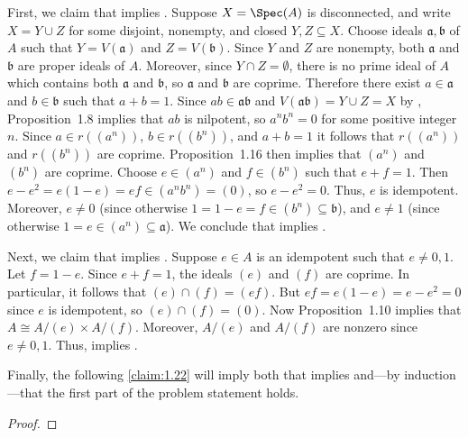 \begin{solution}
First, we claim that  implies .
Suppose \(X = \Spec(A)\) is disconnected, and write \(X = Y \cup Z\) for some disjoint, nonempty, and closed \(Y, Z \subseteq X\).
Choose ideals \(\mathfrak{a}, \mathfrak{b}\) of \(A\) such that \(Y = V(\mathfrak{a})\) and \(Z = V(\mathfrak{b})\).
Since \(Y\) and \(Z\) are nonempty, both \(\mathfrak{a}\) and \(\mathfrak{b}\) are proper ideals of \(A\).
Moreover, since \(Y \cap Z = \emptyset\), there is no prime ideal of \(A\) which contains both \(\mathfrak{a}\) and \(\mathfrak{b}\), so \(\mathfrak{a}\) and \(\mathfrak{b}\) are coprime.
Therefore there exist \(a \in \mathfrak{a}\) and \(b \in \mathfrak{b}\) such that \(a + b = 1\).
Since \(a b \in \mathfrak{a} \mathfrak{b}\) and \(V(\mathfrak{a} \mathfrak{b}) = Y \cup Z = X\) by , Proposition~1.8 implies that \(a b\) is nilpotent, so \(a^n b^n = 0\) for some positive integer \(n\).
Since \(a \in r((a^n))\), \(b \in r((b^n))\), and \(a + b = 1\) it follows that \(r((a^n))\) and \(r((b^n))\) are coprime.
Proposition~1.16 then implies that \((a^n)\) and \((b^n)\) are coprime.
Choose \(e \in (a^n)\) and \(f \in (b^n)\) such that \(e + f = 1\).
Then \(e - e^2 = e (1 - e) = e f \in (a^n b^n) = (0)\), so \(e - e^2 = 0\).
Thus, \(e\) is idempotent.
Moreover, \(e \neq 0\) (since otherwise \(1 = 1 - e = f \in (b^n) \subseteq \mathfrak{b}\)), and \(e \neq 1\) (since otherwise \(1 = e \in (a^n) \subseteq \mathfrak{a}\)).
We conclude that  implies .

Next, we claim that  implies .
Suppose \(e \in A\) is an idempotent such that \(e \neq 0, 1\).
Let \(f = 1 - e\).
Since \(e + f = 1\), the ideals \((e)\) and \((f)\) are coprime.
In particular, it follows that \((e) \cap (f) = (e f)\).
But \(e f = e (1 - e) = e - e^2 = 0\) since \(e\) is idempotent, so \((e) \cap (f) = (0)\).
Now Proposition~1.10 implies that \(A \cong A / (e) \times A / (f)\).
Moreover, \(A / (e)\) and \(A / (f)\) are nonzero since \(e \neq 0, 1\).
Thus,  implies .

Finally, the following \autoref{claim:1.22} will imply both that  implies  and---by induction---that the first part of the problem statement holds.
\end{solution}

\begin{claim}
\label{claim:1.22}

\end{claim}

\begin{proof}

\end{proof}